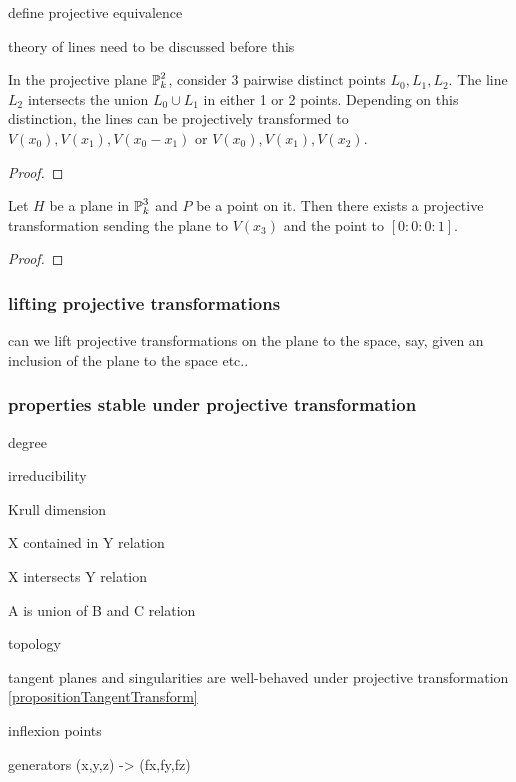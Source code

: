 \begin{todo}
\item define projective equivalence
\item theory of lines need to be discussed before this
\end{todo}
\begin{corollary}
In the projective plane $\operatorname{\mathbb P}^2_k$, consider 3 pairwise distinct points $L_0,L_1,L_2$.
The line $L_2$ intersects the union $L_0 \cup L_1$ in either 1 or 2 points.
Depending on this distinction, the lines can be projectively transformed to $V(x_0),V(x_1),V(x_0-x_1)$ or $V(x_0),V(x_1),V(x_2)$.
\end{corollary}
\begin{proof}
\end{proof}

\begin{corollary}
Let $H$ be a plane in $\operatorname{\mathbb P}^3_k$ and $P$ be a point on it.
Then there exists a projective transformation sending the plane to $V(x_3)$ and the point to $[0:0:0:1]$.
\end{corollary}
\begin{proof}
\end{proof}

\subsubsection{lifting projective transformations}

\begin{todo}
\item can we lift projective transformations on the plane to the space, say, given an inclusion of the plane to the space etc..
\end{todo}

\subsubsection{properties stable under projective transformation}
\begin{todo}
\item degree
\item irreducibility
\item Krull dimension
\item X contained in Y relation
\item X intersects Y relation
\item A is union of B and C relation
\item topology
\item tangent planes and singularities are well-behaved under projective transformation \ref{propositionTangentTransform}
\item inflexion points
\item generators (x,y,z) -> (fx,fy,fz)
\end{todo}

